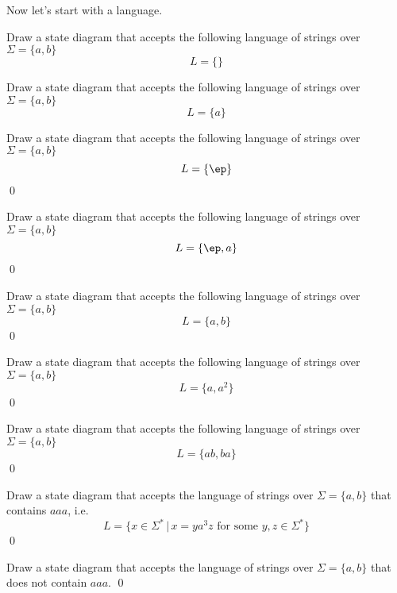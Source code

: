 Now let's start with a language.

\newpage
\begin{ex}
Draw a state diagram that accepts the following
language of strings over $\Sigma =
\{ a, b \}$ 
\[
L = \{\}
\]
\end{ex}


\newpage
\begin{ex}
Draw a state diagram that accepts the following
language of strings over $\Sigma =
\{ a, b \}$ 
\[
L = \{a\}
\]
\end{ex}


\newpage
\begin{ex}
Draw a state diagram that accepts the following
language of strings over $\Sigma =
\{ a, b \}$ 
\[
L = \{\ep\}
\]
\qed
\end{ex}



\newpage
\begin{ex}
Draw a state diagram that accepts the following
language of strings over $\Sigma =
\{ a, b \}$ 
\[
L = \{\ep, a\}
\]
\qed
\end{ex}

\newpage
\begin{ex}
Draw a state diagram that accepts the following
language of strings over $\Sigma =
\{ a, b \}$ 
\[
L = \{a, b\}
\]
\qed
\end{ex}



\newpage
\begin{ex}
Draw a state diagram that accepts the following
language of strings over $\Sigma =
\{ a, b \}$ 
\[
L = \{a, a^2\}
\]
\qed
\end{ex}

\newpage
\begin{ex}
Draw a state diagram that accepts the following
language of strings over $\Sigma =
\{ a, b \}$ 
\[
L = \{ab, ba\}
\]
\qed
\end{ex}

\newpage
\begin{ex}
Draw a state diagram that accepts the language of strings over $\Sigma =
\{ a, b \}$ that contains $aaa$, i.e.
\[
L = \{ x \in \Sigma^* \,|\, x = ya^3 z \text{ for some } y, z \in \Sigma^*\}
\]
\qed
\end{ex}

\newpage
\begin{ex}
Draw a state diagram that accepts the language of strings over $\Sigma
 = \{a, b\}$ that does not contain $aaa$.
\qed
\end{ex}

